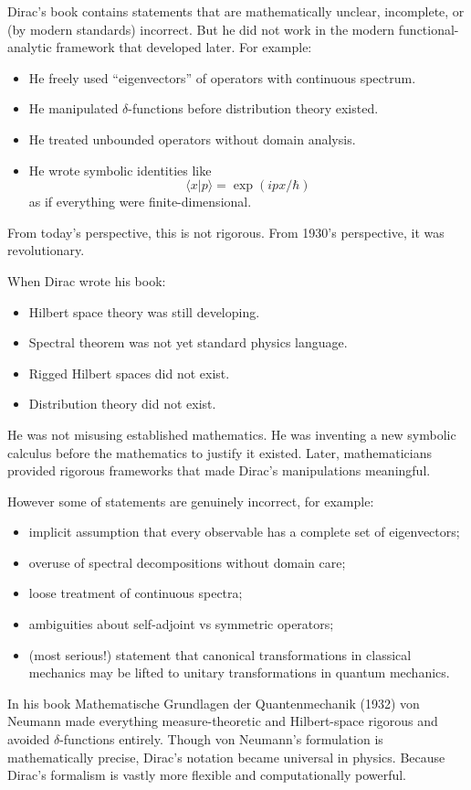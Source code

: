 Dirac's book \cite{dirac-pqm} contains
statements that are mathematically unclear, incomplete, or (by modern standards) incorrect. 
But he did not work in the modern functional-analytic framework that developed later.
For example:
\begin{itemize}
   \item He freely used “eigenvectors” of operators with continuous spectrum.
    \item He manipulated $ \delta $-functions before distribution theory existed.
    \item He treated unbounded operators without domain analysis.
    \item He wrote symbolic identities like \[ \langle x|p \rangle=\exp(i p x/\hbar) \]
as if everything were finite-dimensional.
\end{itemize}
From today’s perspective, this is not rigorous.
From 1930’s perspective, it was revolutionary.

When Dirac wrote his book:
\begin{itemize}
   \item Hilbert space theory was still developing.
\item Spectral theorem was not yet standard physics language.
\item Rigged Hilbert spaces did not exist.
\item Distribution theory did not exist.
\end{itemize}
He was not misusing established mathematics.
He was inventing a new symbolic calculus before the mathematics to justify it existed.
Later, mathematicians 
provided rigorous frameworks that made Dirac’s manipulations meaningful.

However some of statements are genuinely incorrect, for example:
\begin{itemize}
   \item implicit assumption that every observable has a complete set of eigenvectors;
\item overuse of spectral decompositions without domain care;
\item loose treatment of continuous spectra;
\item ambiguities about self-adjoint vs symmetric operators;
\item (most serious!) statement that canonical transformations in classical mechanics 
    may be lifted to unitary transformations in quantum mechanics.
\end{itemize}

In his book \cite{neumann-mfqm}  Mathematische Grundlagen der Quantenmechanik (1932)
von Neumann made everything measure-theoretic and Hilbert-space rigorous and avoided 
$ \delta $-functions entirely.
Though von Neumann’s formulation is mathematically precise,
Dirac’s notation became universal in physics.
Because Dirac’s formalism is vastly more flexible and computationally powerful.


